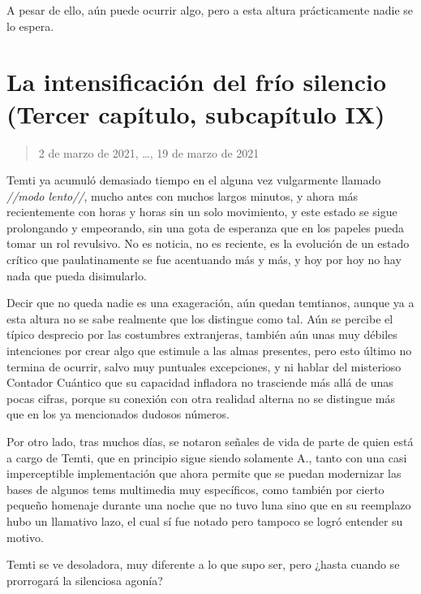 \documentclass[
  spanish,
]{book}
\begin{document}
A pesar de ello, aún puede ocurrir algo, pero a esta altura prácticamente nadie se lo espera.

\hypertarget{la-intensificaciuxf3n-del-fruxedo-silencio-tercer-capuxedtulo-subcapuxedtulo-ix}{%
\section{La intensificación del frío silencio (Tercer capítulo, subcapítulo IX)}\label{la-intensificaciuxf3n-del-fruxedo-silencio-tercer-capuxedtulo-subcapuxedtulo-ix}}

\begin{quote}
2 de marzo de 2021, \ldots, 19 de marzo de 2021
\end{quote}

Temti ya acumuló demasiado tiempo en el alguna vez vulgarmente llamado \emph{//modo lento//}, mucho antes con muchos largos minutos, y ahora más recientemente con horas y horas sin un solo movimiento, y este estado se sigue prolongando y empeorando, sin una gota de esperanza que en los papeles pueda tomar un rol revulsivo. No es noticia, no es reciente, es la evolución de un estado crítico que paulatinamente se fue acentuando más y más, y hoy por hoy no hay nada que pueda disimularlo.

Decir que no queda nadie es una exageración, aún quedan temtianos, aunque ya a esta altura no se sabe realmente que los distingue como tal. Aún se percibe el típico desprecio por las costumbres extranjeras, también aún unas muy débiles intenciones por crear algo que estimule a las almas presentes, pero esto último no termina de ocurrir, salvo muy puntuales excepciones, y ni hablar del misterioso Contador Cuántico que su capacidad infladora no trasciende más allá de unas pocas cifras, porque su conexión con otra realidad alterna no se distingue más que en los ya mencionados dudosos números.

Por otro lado, tras muchos días, se notaron señales de vida de parte de quien está a cargo de Temti, que en principio sigue siendo solamente A., tanto con una casi imperceptible implementación que ahora permite que se puedan modernizar las bases de algunos tems multimedia muy específicos, como también por cierto pequeño homenaje durante una noche que no tuvo luna sino que en su reemplazo hubo un llamativo lazo, el cual sí fue notado pero tampoco se logró entender su motivo.

Temti se ve desoladora, muy diferente a lo que supo ser, pero ¿hasta cuando se prorrogará la silenciosa agonía?
\end{document}
